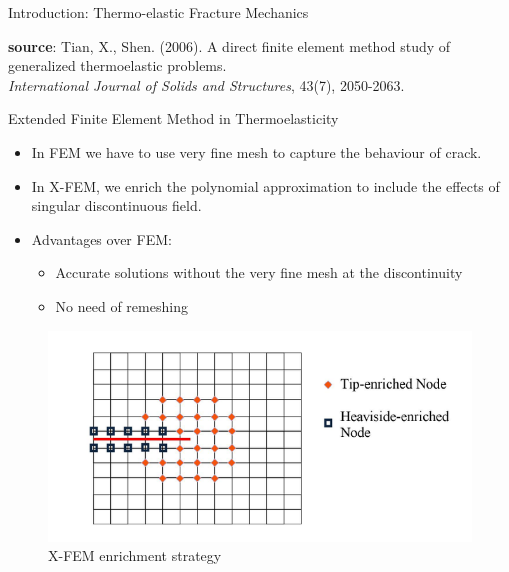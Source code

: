 \documentclass{beamer}
\begin{document}
\begin{frame}[t,fragile]{Introduction: Thermo-elastic Fracture Mechanics}
\begin{itemize}
\begin{figure}[H]
\begin{subfigure}{0.45\textwidth}
 \end{subfigure}
 \end{figure}
 \end{itemize}
 \vspace{.1cm}
   \tiny
   \hspace{15pt}
    \textbf{source}: Tian, X., Shen. (2006). A direct finite element method study of generalized thermoelastic problems. \\
   \vspace{-7pt}
   \hspace{15pt}
   \emph{International Journal of Solids and Structures}, 43(7), 2050-2063.
\end{frame}
\begin{frame}[t,fragile]{Extended Finite Element Method in Thermoelasticity}
    \vspace{-.3cm}
    \small
    \begin{itemize}
         \item In FEM we have to use very fine mesh to capture the behaviour of crack. 
\item In X-FEM, we enrich the polynomial approximation to include the effects of singular discontinuous field.
     \item Advantages over FEM:
    \begin{itemize}
         \item Accurate solutions without the very fine mesh at the discontinuity
         \item No need of remeshing 
    \end{itemize}
\end{itemize} 
\begin{figure}
     \centering
     \vspace{-10pt}
     \includegraphics[scale=.3]{enrich.png}
     \vspace{-.4cm}
     \caption{\hspace{-2cm}\footnotesize X-FEM enrichment strategy}
  \end{figure}
\end{frame}
\end{document}
